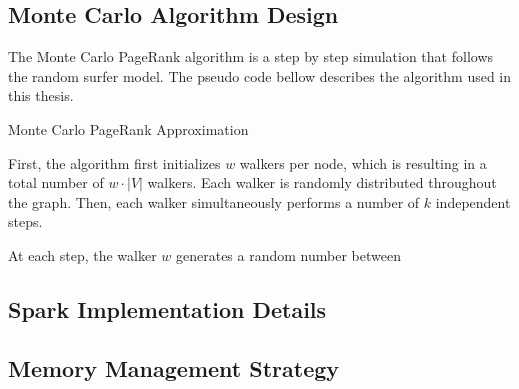 \subsection{Monte Carlo Algorithm Design}

The Monte Carlo PageRank algorithm is a step by step simulation that follows the random surfer model. 
The pseudo code bellow describes the algorithm used in this thesis. 

\vspace{0.5em}
\begin{algorithm}[H]
\caption{Monte Carlo PageRank Approximation}

\end{algorithm}
\vspace{0.5em}

First, the algorithm first initializes $w$ walkers per node, which is resulting in a total number of $w\cdot |V|$ walkers. Each walker is randomly distributed throughout the graph. Then, each walker simultaneously performs a number of $k$ independent steps. \par
At each step, the walker $w$ generates a random number between 



\subsection{Spark Implementation Details}


\subsection{Memory Management Strategy}

 